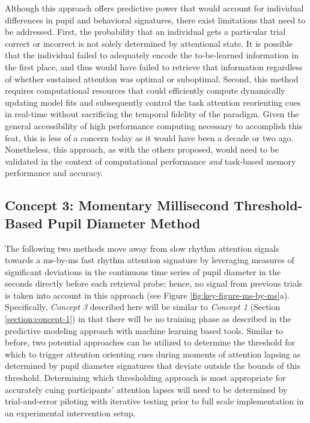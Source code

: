Although this approach offers predictive power that would account for individual differences in pupil and behavioral signatures, there exist limitations that need to be addressed. First, the probability that an individual gets a particular trial correct or incorrect is not solely determined by attentional state. It is possible that the individual failed to adequately encode the to-be-learned information in the first place, and thus would have failed to retrieve that information regardless of whether sustained attention was optimal or suboptimal. Second, this method requires computational resources that could efficiently compute dynamically updating model fits and subsequently control the task attention reorienting cues in real-time without sacrificing the temporal fidelity of the paradigm. Given the general accessibility of high performance computing necessary to accomplish this feat, this is less of a concern today as it would have been a decade or two ago. Nonetheless, this approach, as with the others proposed, would need to be validated in the context of computational performance \emph{and} task-based memory performance and accuracy.

\subsection{Concept 3: Momentary Millisecond Threshold-Based Pupil Diameter Method}
\label{section:concept-3}
The following two methods move away from slow rhythm attention signals towards a ms-by-ms fast rhythm attention signature by leveraging measures of significant deviations in the continuous time series of pupil diameter in the seconds directly before each retrieval probe; hence, no signal from previous trials is taken into account in this approach (see Figure \ref{fig:key-figure-ms-by-ms}a). Specifically, \emph{Concept 3} described here will be similar to \emph{Concept 1} (Section \ref{section:concept-1}) in that there will be no training phase as described in the predictive modeling approach with machine learning based tools. Similar to before, two potential approaches can be utilized to determine the threshold for which to trigger attention orienting cues during moments of attention lapsing as determined by pupil diameter signatures that deviate outside the bounds of this threshold. Determining which thresholding approach is most appropriate for accurately cuing participants' attention lapses will need to be determined by trial-and-error piloting with iterative testing prior to full scale implementation in an experimental intervention setup.

